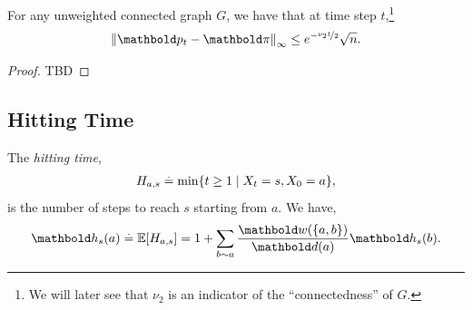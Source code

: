 \begin{thm}
For any unweighted connected graph $G$, we have that at time step $t$,\footnote{We will later see that $\nu_2$ is an indicator of the ``connectedness'' of $G$.} \begin{align}
    \norm{\vp_t - \vpi}_\infty \leq e^{-\nicefrac{\nu_2 t}{2}}\sqrt{n}.
\end{align}
\end{thm}
\begin{proof}
TBD
\end{proof}

\subsection{Hitting Time}

\begin{defn} The \emph{hitting time}, \begin{align}
    H_{a,s} \overset{.}{=} \min\{t \geq 1 \mid X_t = s, X_0 = a\},
\end{align} is the number of steps to reach $s$ starting from $a$. We have, \begin{align}
    \vh_s(a) \defeq \E{H_{a,s}} = 1 + \sum_{b \sim a} \frac{\vw(\{a,b\})}{\vd(a)} \vh_s(b). \label{eq:expected_hitting_time}
\end{align}
\end{defn}

